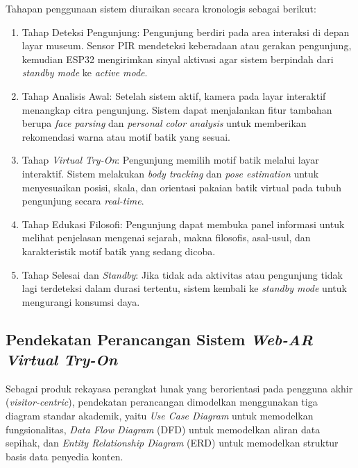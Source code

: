 Tahapan penggunaan sistem diuraikan secara kronologis sebagai berikut:
\begin{enumerate}
    \item Tahap Deteksi Pengunjung: Pengunjung berdiri pada area interaksi di depan layar museum. Sensor PIR mendeteksi keberadaan atau gerakan pengunjung, kemudian ESP32 mengirimkan sinyal aktivasi agar sistem berpindah dari \textit{standby mode} ke \textit{active mode}.

    \item Tahap Analisis Awal: Setelah sistem aktif, kamera pada layar interaktif menangkap citra pengunjung. Sistem dapat menjalankan fitur tambahan berupa \textit{face parsing} dan \textit{personal color analysis} untuk memberikan rekomendasi warna atau motif batik yang sesuai.

    \item Tahap \textit{Virtual Try-On}: Pengunjung memilih motif batik melalui layar interaktif. Sistem melakukan \textit{body tracking} dan \textit{pose estimation} untuk menyesuaikan posisi, skala, dan orientasi pakaian batik virtual pada tubuh pengunjung secara \textit{real-time}.

    \item Tahap Edukasi Filosofi: Pengunjung dapat membuka panel informasi untuk melihat penjelasan mengenai sejarah, makna filosofis, asal-usul, dan karakteristik motif batik yang sedang dicoba.

    \item Tahap Selesai dan \textit{Standby}: Jika tidak ada aktivitas atau pengunjung tidak lagi terdeteksi dalam durasi tertentu, sistem kembali ke \textit{standby mode} untuk mengurangi konsumsi daya.
\end{enumerate}

\subsection{Pendekatan Perancangan Sistem \textit{Web-AR Virtual Try-On}}
\label{subsec:pendekatan_perancangan_produk}

Sebagai produk rekayasa perangkat lunak yang berorientasi pada pengguna akhir (\textit{visitor-centric}), pendekatan perancangan dimodelkan menggunakan tiga diagram standar akademik, yaitu \textit{Use Case Diagram} untuk memodelkan fungsionalitas, \textit{Data Flow Diagram} (DFD) untuk memodelkan aliran data sepihak, dan \textit{Entity Relationship Diagram} (ERD) untuk memodelkan struktur basis data penyedia konten.

